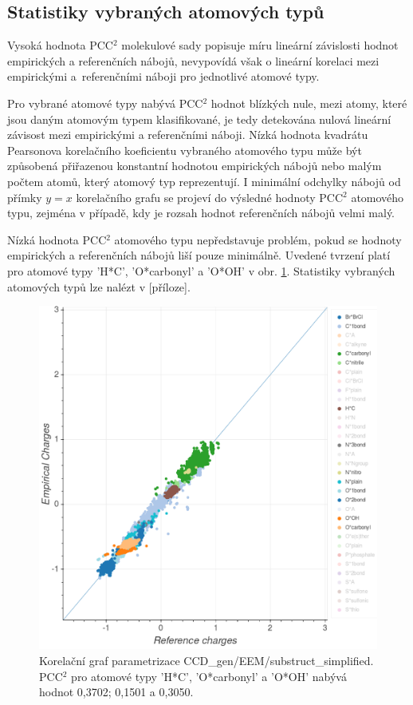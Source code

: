 \subsection{Statistiky vybraných atomových typů}
Vysoká hodnota PCC$^2$ molekulové sady popisuje míru lineární závislosti hodnot empirických a referenčních nábojů, nevypovídá však o lineární korelaci mezi empirickými a~referenčními náboji pro jednotlivé atomové typy.

Pro vybrané atomové typy nabývá PCC$^2$ hodnot blízkých nule, mezi atomy, které jsou daným atomovým typem klasifikované, je tedy detekována nulová lineární závisost mezi empirickými a referenčními náboji. Nízká hodnota kvadrátu Pearsonova korelačního koeficientu vybraného atomového typu může být způsobená přiřazenou konstantní hodnotou empirických nábojů nebo malým počtem atomů, který atomový typ reprezentují. I minimální odchylky nábojů od přímky $y = x$ korelačního grafu se projeví do výsledné hodnoty PCC$^2$ atomového typu, zejména v případě, kdy je rozsah hodnot referenčních nábojů  velmi malý. 

Nízká hodnota PCC$^2$ atomového typu nepředstavuje problém, pokud se hodnoty empirických a referenčních nábojů liší pouze minimálně. Uvedené tvrzení platí pro atomové typy 'H*C', 'O*carbonyl' a 'O*OH' v obr. \ref{graph_pcc_atom_types}. Statistiky vybraných atomových typů lze nalézt v [příloze]. 


\vspace{0,5cm}
\begin{figure}[h]
\begin{center}
\includegraphics[width=13cm]{pictures/graph_pcc_atom_types.png}
\caption{Korelační graf parametrizace CCD\_gen/EEM/substruct\_simplified. PCC$^2$ pro atomové typy 'H*C', 'O*carbonyl' a 'O*OH' nabývá hodnot 0,3702; 0,1501 a 0,3050.}
\label{graph_pcc_atom_types}
\end{center}
\end{figure}

